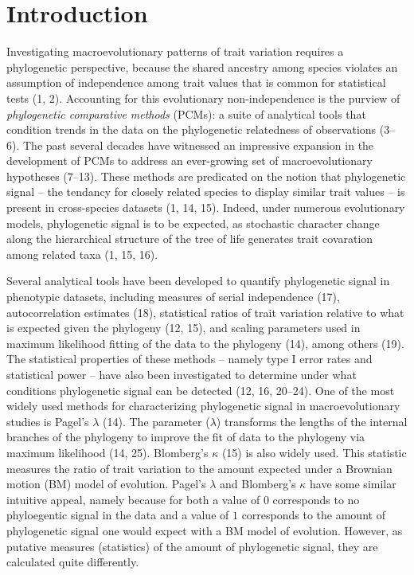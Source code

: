 \documentclass[]{article}
\begin{document}
\newpage

\hypertarget{introduction}{%
\section{Introduction}\label{introduction}}

Investigating macroevolutionary patterns of trait variation requires a
phylogenetic perspective, because the shared ancestry among species
violates an assumption of independence among trait values that is common
for statistical tests (1, 2). Accounting for this evolutionary
non-independence is the purview of \emph{phylogenetic comparative
methods} (PCMs): a suite of analytical tools that condition trends in
the data on the phylogenetic relatedness of observations (3--6). The
past several decades have witnessed an impressive expansion in the
development of PCMs to address an ever-growing set of macroevolutionary
hypotheses (7--13). These methods are predicated on the notion that
phylogenetic signal -- the tendancy for closely related species to
display similar trait values -- is present in cross-species datasets (1,
14, 15). Indeed, under numerous evolutionary models, phylogenetic signal
is to be expected, as stochastic character change along the hierarchical
structure of the tree of life generates trait covaration among related
taxa (1, 15, 16). \hfill\break

Several analytical tools have been developed to quantify phylogenetic
signal in phenotypic datasets, including measures of serial independence
(17), autocorrelation estimates (18), statistical ratios of trait
variation relative to what is expected given the phylogeny (12, 15), and
scaling parameters used in maximum likelihood fitting of the data to the
phylogeny (14), among others (19). The statistical properties of these
methods -- namely type I error rates and statistical power -- have also
been investigated to determine under what conditions phylogenetic signal
can be detected (12, 16, 20--24). One of the most widely used methods
for characterizing phylogenetic signal in macroevolutionary studies is
Pagel's \(\lambda\) (14). The parameter (\(\lambda\)) transforms the
lengths of the internal branches of the phylogeny to improve the fit of
data to the phylogeny via maximum likelihood (14, 25). Blomberg's
\(\kappa\) (15) is also widely used. This statistic measures the ratio
of trait variation to the amount expected under a Brownian motion (BM)
model of evolution. Pagel's \(\lambda\) and Blomberg's \(\kappa\) have
some similar intuitive appeal, namely because for both a value of \(0\)
corresponds to no phyloegentic signal in the data and a value of \(1\)
corresponds to the amount of phylogenetic signal one would expect with a
BM model of evolution. However, as putative measures (statistics) of the
amount of phylogenetic signal, they are calculated quite differently.
\hfill\break
\end{document}
